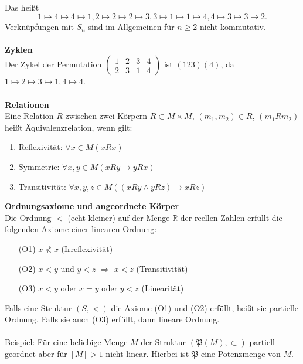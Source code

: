 \documentclass[a4paper,12pt]{article}
\numberwithin{equation}{section}
\begin{document}
Das heißt
\[ 
1\mapsto4\mapsto4\mapsto1,2\mapsto2\mapsto2\mapsto3,3\mapsto1\mapsto1\mapsto4,4\mapsto3\mapsto3\mapsto2
.\] 
Verknüpfungen mit $S_{n}$ sind im Allgemeinen für $n\geq 2$ nicht kommutativ.
\\\hfill\\\textbf{Zyklen}\\
Der Zykel der Permutation 
$\left( \begin{matrix}
        1&2&3&4\\
        2&3&1&4
\end{matrix}\right) $
ist $\left( 123\right) \left( 4\right)  $, da $1\mapsto2\mapsto3\mapsto1,4\mapsto4$.
\\\hfill\\\textbf{Relationen}\\
Eine Relation $R$ zwischen zwei Körpern $R\subset M\times M$, $\left( m_1,m_2\right)  \in R$, $\left( m_1Rm_2\right) $ heißt Äquivalenzrelation, wenn gilt:
\begin{enumerate}[wide,label=(\alph*)]
        \item Reflexivität: $\forall x \in M\left( xRx\right) $ 
        \item Symmetrie: $\forall x,y \in M\left( xRy\rightarrow yRx\right) $ 
        \item Transitivität: $\forall x,y,z \in M\left( \left( xRy\land yRz\right) \rightarrow xRz\right) $ 
\end{enumerate}
\textbf{Ordnungsaxiome und angeordnete Körper}\\
Die Ordnung $<$ (echt kleiner) auf der Menge $\mathbb{R}$ der reellen Zahlen erfüllt die folgenden Axiome einer linearen Ordnung:
\begin{enumerate}[wide,label=]
        \item[(O1)] $x\nless x$ (Irreflexivität) 
        \item[(O2)] $x<y$ und $y<z$ $\Rightarrow $ $x<z$ (Transitivität)
        \item[(O3)] $x<y$ oder $x=y$ oder $y<z$ (Linearität)
\end{enumerate}
Falls eine Struktur $\left( S,<\right) $ die Axiome (O1) und (O2) erfüllt, heißt sie partielle Ordnung. Falls sie auch (O3) erfüllt, dann lineare Ordnung.\\\\
Beispiel: Für eine beliebige Menge $M$ der Struktur $\left( \mathfrak{P}\left( M\right) ,\subset \right) $ partiell geordnet aber für $\,|\, M\,|\, >1$ nicht linear. Hierbei ist $\mathfrak{P}$ eine Potenzmenge von $M$.\\\\
\end{document}
